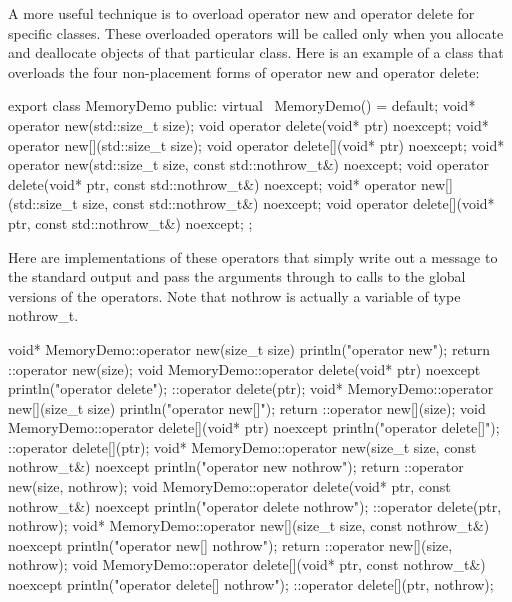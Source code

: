 A more useful technique is to overload operator new and operator delete for specific classes.
These overloaded operators will be called only when you allocate and deallocate objects of that particular class. Here is an example of a class that overloads the four non-placement forms of operator new and operator delete:

\begin{cpp}
export class MemoryDemo
{
    public:
        virtual ~MemoryDemo() = default;
        void* operator new(std::size_t size);
        void operator delete(void* ptr) noexcept;
        void* operator new[](std::size_t size);
        void operator delete[](void* ptr) noexcept;
        void* operator new(std::size_t size, const std::nothrow_t&) noexcept;
        void operator delete(void* ptr, const std::nothrow_t&) noexcept;
        void* operator new[](std::size_t size, const std::nothrow_t&) noexcept;
        void operator delete[](void* ptr, const std::nothrow_t&) noexcept;
};
\end{cpp}

Here are implementations of these operators that simply write out a message to the standard output and pass the arguments through to calls to the global versions of the operators. Note that nothrow is actually a variable of type nothrow\_t.

\begin{cpp}
void* MemoryDemo::operator new(size_t size)
{
    println("operator new");
    return ::operator new(size);
}
void MemoryDemo::operator delete(void* ptr) noexcept
{
    println("operator delete");
    ::operator delete(ptr);
}
void* MemoryDemo::operator new[](size_t size)
{
    println("operator new[]");
    return ::operator new[](size);
}
void MemoryDemo::operator delete[](void* ptr) noexcept
{
    println("operator delete[]");
    ::operator delete[](ptr);
}
void* MemoryDemo::operator new(size_t size, const nothrow_t&) noexcept
{
    println("operator new nothrow");
    return ::operator new(size, nothrow);
}
void MemoryDemo::operator delete(void* ptr, const nothrow_t&) noexcept
{
    println("operator delete nothrow");
    ::operator delete(ptr, nothrow);
}
void* MemoryDemo::operator new[](size_t size, const nothrow_t&) noexcept
{
    println("operator new[] nothrow");
    return ::operator new[](size, nothrow);
}
void MemoryDemo::operator delete[](void* ptr, const nothrow_t&) noexcept
{
    println("operator delete[] nothrow");
    ::operator delete[](ptr, nothrow);
}
\end{cpp}

